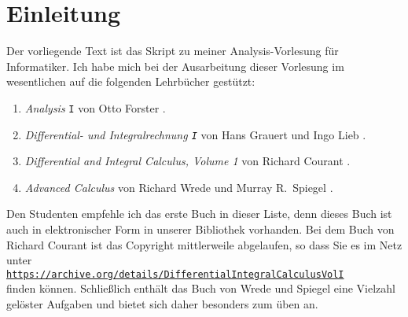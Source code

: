 \chapter{Einleitung}
Der vorliegende Text ist das Skript zu meiner Analysis-Vorlesung f\"ur Informatiker.  Ich habe mich
bei der Ausarbeitung dieser Vorlesung im wesentlichen auf die folgenden Lehrb\"ucher gest\"utzt:
\begin{enumerate}
\item \emph{Analysis} \texttt{I} von Otto Forster \cite{forster:2011}.
\item \emph{Differential- und Integralrechnung \texttt{I}} von Hans Grauert und Ingo Lieb \cite{grauert:1967}.
\item \emph{Differential and Integral Calculus, Volume 1} von Richard Courant  \cite{courant:1937}.
\item \emph{Advanced Calculus} von Richard Wrede und Murray R.~Spiegel \cite{wrede:2010}.
\end{enumerate}
Den Studenten empfehle ich das erste Buch in dieser Liste, denn dieses Buch ist auch in
elektronischer Form in unserer Bibliothek vorhanden.  Bei dem Buch von Richard Courant ist das
Copyright mittlerweile abgelaufen, so dass Sie es im Netz unter
\\[0.2cm]
\hspace*{0.3cm}
\href{https://archive.org/details/DifferentialIntegralCalculusVolI}{\texttt{https://archive.org/details/DifferentialIntegralCalculusVolI}}
\\[0.2cm]
finden k\"onnen.  Schlie\ss{}lich enth\"alt das Buch von Wrede und Spiegel eine Vielzahl gel\"oster
Aufgaben und bietet sich daher besonders zum \"uben an.

